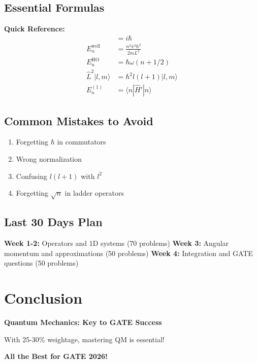 \documentclass[12pt,a4paper]{article}
\theoremstyle{definition}
\begin{document}
\subsection{Essential Formulas}

\begin{importantbox}
\textbf{Quick Reference:}
\begin{align*}
[\hat{x}, \hat{p}_x] &= i\hbar \\
E_n^{\text{well}} &= \frac{n^2\pi^2\hbar^2}{2mL^2} \\
E_n^{\text{HO}} &= \hbar\omega(n + 1/2) \\
\hat{L}^2|l,m\rangle &= \hbar^2 l(l+1)|l,m\rangle \\
E_n^{(1)} &= \langle n|\hat{H}'|n\rangle
\end{align*}
\end{importantbox}

\subsection{Common Mistakes to Avoid}

\begin{enumerate}
    \item Forgetting $\hbar$ in commutators
    \item Wrong normalization
    \item Confusing $l(l+1)$ with $l^2$
    \item Forgetting $\sqrt{n}$ in ladder operators
\end{enumerate}

\subsection{Last 30 Days Plan}

\begin{importantbox}
\textbf{Week 1-2:} Operators and 1D systems (70 problems)
\textbf{Week 3:} Angular momentum and approximations (50 problems)
\textbf{Week 4:} Integration and GATE questions (50 problems)
\end{importantbox}

\section*{Conclusion}

\begin{center}
\Large\textbf{Quantum Mechanics: Key to GATE Success}

\vspace{0.5cm}

With 25-30\% weightage, mastering QM is essential!

\vspace{0.5cm}

\Huge\textbf{All the Best for GATE 2026!}
\end{center}
\end{document}
